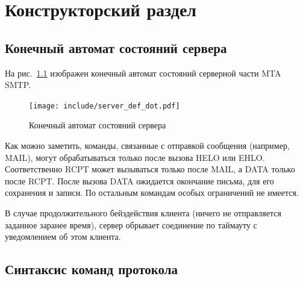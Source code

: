 \documentclass[a4paper,12pt]{report}
\begin{document}
\chapter{Конструкторский раздел}


\section{Конечный автомат состояний сервера}

На рис.~\ref{fig:fsm} изображен конечный автомат состояний серверной части MTA SMTP. 

\begin{figure}[h]
    \centering
    \texttt{[image: include/server\_def\_dot.pdf]}
    \caption{Конечный автомат состояний сервера}
    \label{fig:fsm}
\end{figure}

Как можно заметить, команды, связанные с отправкой сообщения (например, MAIL), могут обрабатываться только после вызова HELO или EHLO. Соответственно RCPT может вызываться только после MAIL, а DATA только после RCPT. После вызова DATA ожидается окончание письма, для его сохранения и записи. По остальным командам особых ограничений не имеется. 

В случае продолжительного бейздействия клиента (ничего не отправляется заданное заранее время), сервер обрывает соединение по таймауту с уведомлением об этом клиента.


\section{Синтаксис команд протокола}
\end{document}
